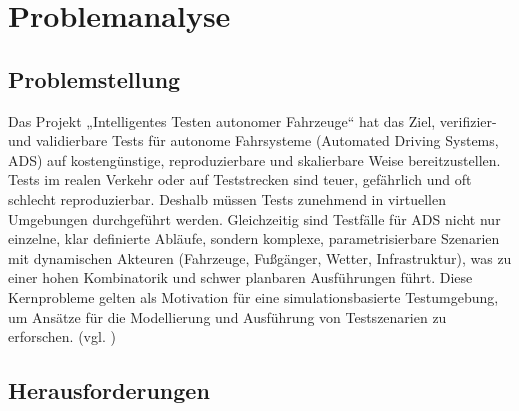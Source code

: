 \chapter{Problemanalyse}

\section{Problemstellung}

Das Projekt „Intelligentes Testen autonomer Fahrzeuge“ hat das Ziel, verifizier- und validierbare Tests für autonome Fahrsysteme (Automated Driving Systems, ADS) auf kostengünstige, reproduzierbare und skalierbare Weise bereitzustellen. Tests im realen Verkehr oder auf Teststrecken sind teuer, gefährlich und oft schlecht reproduzierbar. Deshalb müssen Tests zunehmend in virtuellen Umgebungen durchgeführt werden. Gleichzeitig sind Testfälle für ADS nicht nur einzelne, klar definierte Abläufe, sondern komplexe, parametrisierbare Szenarien mit dynamischen Akteuren (Fahrzeuge, Fußgänger, Wetter, Infrastruktur), was zu einer hohen Kombinatorik und schwer planbaren Ausführungen führt. Diese Kernprobleme gelten als Motivation für eine simulationsbasierte Testumgebung, um Ansätze für die Modellierung und Ausführung von Testszenarien zu erforschen. (vgl. \cite{EinfuehrungIntegrationsprojekt})

\section{Herausforderungen}


